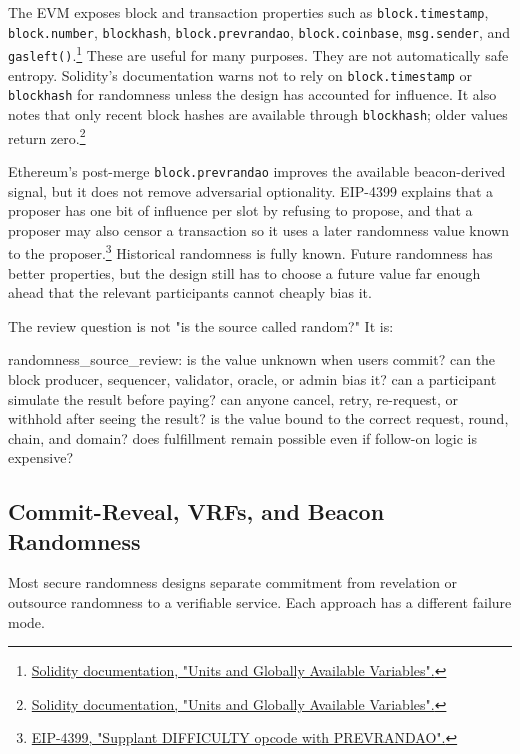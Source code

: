 The EVM exposes block and transaction properties such as \texttt{block.timestamp}, \texttt{block.number}, \texttt{blockhash}, \texttt{block.prevrandao}, \texttt{block.coinbase}, \texttt{msg.sender}, and \texttt{gasleft()}.\footnote{\href{https://docs.soliditylang.org/en/latest/units-and-global-variables.html}{Solidity documentation, "Units and Globally Available Variables".}} These are useful for many purposes. They are not automatically safe entropy. Solidity's documentation warns not to rely on \texttt{block.timestamp} or \texttt{blockhash} for randomness unless the design has accounted for influence. It also notes that only recent block hashes are available through \texttt{blockhash}; older values return zero.\footnote{\href{https://docs.soliditylang.org/en/latest/units-and-global-variables.html}{Solidity documentation, "Units and Globally Available Variables".}}

Ethereum's post-merge \texttt{block.prevrandao} improves the available beacon-derived signal, but it does not remove adversarial optionality. EIP-4399 explains that a proposer has one bit of influence per slot by refusing to propose, and that a proposer may also censor a transaction so it uses a later randomness value known to the proposer.\footnote{\href{https://eips.ethereum.org/EIPS/eip-4399}{EIP-4399, "Supplant DIFFICULTY opcode with PREVRANDAO".}} Historical randomness is fully known. Future randomness has better properties, but the design still has to choose a future value far enough ahead that the relevant participants cannot cheaply bias it.

The review question is not "is the source called random?" It is:

\begin{codeblock}
randomness_source_review:
    is the value unknown when users commit?
    can the block producer, sequencer, validator, oracle, or admin bias it?
    can a participant simulate the result before paying?
    can anyone cancel, retry, re-request, or withhold after seeing the result?
    is the value bound to the correct request, round, chain, and domain?
    does fulfillment remain possible even if follow-on logic is expensive?
\end{codeblock}

\subsection{Commit-Reveal, VRFs, and Beacon Randomness}

Most secure randomness designs separate commitment from revelation or outsource randomness to a verifiable service. Each approach has a different failure mode.

